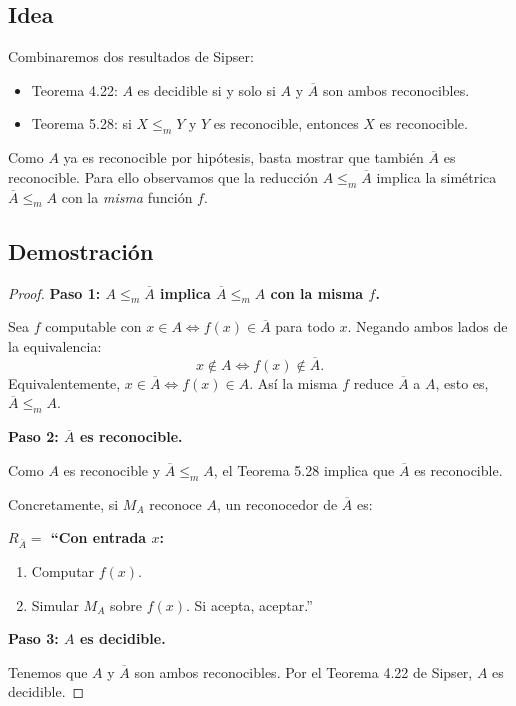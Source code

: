 \documentclass[11pt,a4paper]{article}
\theoremstyle{plain}
\theoremstyle{definition}
\theoremstyle{remark}
\newcommand{\redm}{\le_{m}}
\newcommand{\compl}[1]{\overline{#1}}
\begin{document}
\subsection*{Idea}

Combinaremos dos resultados de Sipser:
\begin{itemize}
  \item Teorema 4.22: $A$ es decidible si y solo si $A$ y $\compl{A}$ son
        ambos reconocibles.
  \item Teorema 5.28: si $X\redm Y$ y $Y$ es reconocible, entonces $X$ es
        reconocible.
\end{itemize}

Como $A$ ya es reconocible por hip\'otesis, basta mostrar que tambi\'en
$\compl{A}$ es reconocible. Para ello observamos que la reducci\'on
$A\redm \compl{A}$ implica la sim\'etrica $\compl{A}\redm A$ con la
\emph{misma} funci\'on $f$.

\subsection*{Demostraci\'on}

\begin{proof}
\textbf{Paso 1: $A\redm \compl{A}$ implica $\compl{A}\redm A$ con la misma $f$.}

Sea $f$ computable con $x\in A \iff f(x)\in\compl{A}$ para todo $x$.
Negando ambos lados de la equivalencia:
\[
  x\notin A \iff f(x)\notin\compl{A}.
\]
Equivalentemente, $x\in\compl{A} \iff f(x)\in A$. As\'i la misma $f$
reduce $\compl{A}$ a $A$, esto es, $\compl{A}\redm A$.

\textbf{Paso 2: $\compl{A}$ es reconocible.}

Como $A$ es reconocible y $\compl{A}\redm A$, el Teorema 5.28 implica que
$\compl{A}$ es reconocible.

Concretamente, si $M_A$ reconoce $A$, un reconocedor de $\compl{A}$ es:

\medskip\noindent\textbf{$R_{\compl{A}}=$ ``Con entrada $x$:}
\begin{enumerate}
  \item Computar $f(x)$.
  \item Simular $M_A$ sobre $f(x)$. Si acepta, aceptar.''
\end{enumerate}
\medskip

\textbf{Paso 3: $A$ es decidible.}

Tenemos que $A$ y $\compl{A}$ son ambos reconocibles. Por el Teorema 4.22
de Sipser, $A$ es decidible.
\end{proof}
\end{document}
